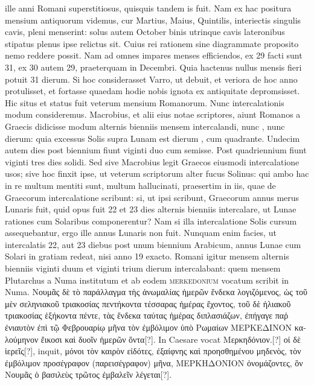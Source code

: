 ille anni Romani superstitiosus, quisquis tandem is fuit.
Nam ex hac
positura mensium antiquorum videmus, cur Martius, Maius, Quintilis,
interiectis singulis cavis, pleni menserint: solus autem October
binis utrinque cavis lateronibus stipatus plenus ipse relictus sit.
Cuius rei rationem sine diagrammate proposito nemo reddere possit.
Nam ad omnes impares menses efficiendos, ex 29 facti sunt 31,
ex 30 autem 29, praeterquam in Decembri.
Quia hactenus nullus
mensis fieri potuit 31 dierum.
Si hoc considerasset Varro, ut debuit,
et veriora de hoc anno protulisset, et fortasse quaedam hodie nobis
ignota ex antiquitate depromsisset.
Hic situs et status fuit veterum
mensium Romanorum.
Nunc intercalationis modum consideremus.
Macrobius, et alii eius notae scriptores, aiunt Romanos a
Graecis didicisse modum alternis bienniis mensem intercalandi, nunc
, nunc  dierum: quia excessus Solis supra Lunam est
dierum , cum quadrante.
Undecim autem dies post biennium
fiunt viginti duo cum semisse.
Post quadriennium fiunt viginti tres
dies solidi.
Sed sive Macrobius legit Graecos eiusmodi intercalatione
usos; sive hoc finxit ipse, ut veterum scriptorum alter fucus Solinus:
qui ambo hac in re multum mentiti sunt, multum hallucinati,
praesertim in iis, quae de Graecorum intercalatione scribunt: si,
ut ipsi scribunt, Graecorum annus merus Lunaris fuit, quid opus fuit
22 et 23 dies alternis bienniis intercalare, ut Lunae rationes cum Solaribus
componerentur?
Nam si illa intercalatione Solis cursum
assequebantur, ergo ille annus Lunaris non fuit.
Nunquam enim
facies, ut intercalatis 22, aut 23 diebus post unum biennium Arabicum,
annus Lunae cum Solari in gratiam redeat, nisi anno 19 exacto.
Romani igitur mensem alternis bienniis viginti duum et viginti
trium dierum intercalabant: quem mensem Plutarchus a Numa
institutum et ab eodem \textsc{merkedonium} vocatum scribit in
Numa.
\textgreek{Νουμᾶς δὲ τὸ παράλλαγμα τὴς ἀνωμαλίας ἡμερῶν ἕνδεκα
 λογιζόμενος,
ὡς τοῦ μὲν σεληνιακοῦ τριακοσίας πεντήκοντα τέσσαρας ἡμέρας ἔχοντος, τοῦ δὲ
ἡλιακοῦ τριακοσίας ἑξήκοντα πέντε, τὰς ἕνδεκα ταύτας ἡμέρας διπλασιάζων,
 ἐπήγαγε
παῤ ἐνιαυτὸν ἐπὶ τῷ Φεβρουαρίῳ μῆνα τὸν ἐμβόλιμον ὑπὸ Ρωμαίων
ΜΕΡΚΕΔΙΝΟΝ καλούμηνον ἔικοσι καὶ δυοῖν ἡμερῶν ὄντα[?]}.
In Caesare vocat
\textgreek{Μερκηδόνιον.[?]}
\textgreek{οἱ δὲ ἱερεῖς[?]}, inquit, \textgreek{μόνοι τὸν καιρὸν εἰδότες,
 ἐξαίφνης
καὶ προησθημένου μηδενὸς, τὸν ἐμβόλιμον προσέγραφον (παρεισέγραφον)
μῆνα, ΜΕΡΚΗΔΟΝΙΟΝ ὀνομάζοντες, ὃν Νουμᾶς ὁ βασιλεὺς
τρῶτος ἐμβαλεῖν λέγεται[?]}.
